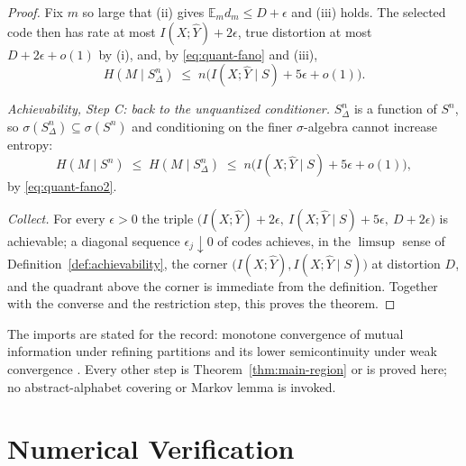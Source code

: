 \documentclass[11pt,onecolumn]{IEEEtran}
\newcommand{\E}{\mathbb{E}}
\newcommand{\hY}{\widehat{Y}}
\begin{document}
\begin{proof}
Fix $m$ so large that (ii) gives $\E_m d_m\le D+\epsilon$ and (iii)
holds. The selected code then has rate at most $I(X;\hY)+2\epsilon$,
true distortion at most $D+2\epsilon+o(1)$ by (i), and, by
\eqref{eq:quant-fano} and (iii),
\begin{equation}
H(M\mid S_\Delta^n)\;\le\;n\bigl(I(X;\hY\mid S)+5\epsilon+o(1)\bigr).
\label{eq:quant-fano2}
\end{equation}

\emph{Achievability, Step C: back to the unquantized conditioner.}
$S_\Delta^n$ is a function of $S^n$, so
$\sigma(S_\Delta^n)\subseteq\sigma(S^n)$ and conditioning on the finer
$\sigma$-algebra cannot increase entropy:
\begin{equation}
H(M\mid S^n)\;\le\;H(M\mid S_\Delta^n)
\;\le\;n\bigl(I(X;\hY\mid S)+5\epsilon+o(1)\bigr),
\label{eq:quant-back}
\end{equation}
by \eqref{eq:quant-fano2}.

\emph{Collect.} For every $\epsilon>0$ the triple
$\bigl(I(X;\hY)+2\epsilon,\ I(X;\hY\mid S)+5\epsilon,\
D+2\epsilon\bigr)$ is achievable; a diagonal sequence
$\epsilon_j\downarrow0$ of codes achieves, in the $\limsup$ sense of
Definition~\ref{def:achievability}, the corner
$\bigl(I(X;\hY),I(X;\hY\mid S)\bigr)$ at distortion $D$, and the
quadrant above the corner is immediate from the definition. Together
with the converse and the restriction step, this proves the theorem.
\end{proof}

The imports are stated for the record: monotone convergence of mutual
information under refining partitions \cite[Ch.~2]{pinsker1964} and its
lower semicontinuity under weak convergence \cite{posner1975}. Every
other step is Theorem~\ref{thm:main-region} or is proved here; no
abstract-alphabet covering or Markov lemma is invoked.

\section{Numerical Verification}
\label{app:numver}
\end{document}
